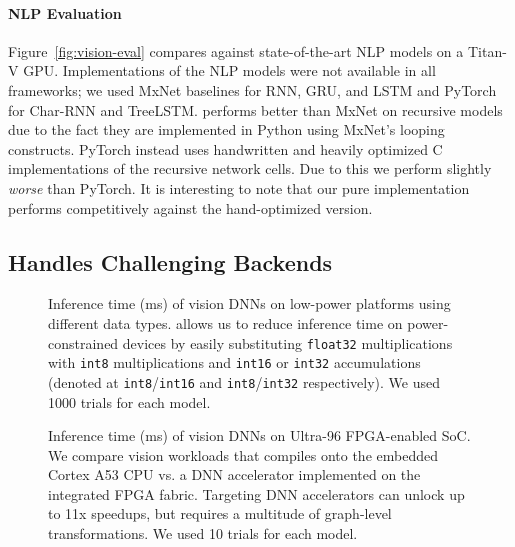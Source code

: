   \paragraph{NLP Evaluation}
  Figure~\ref{fig:vision-eval} compares \relay against state-of-the-art NLP models on a Titan-V GPU.
  Implementations of the NLP models were not available in all frameworks;
    we used MxNet baselines for RNN, GRU, and LSTM and PyTorch for Char-RNN and TreeLSTM.
  \relay performs better than MxNet on recursive models
    due to the fact they are implemented in Python using
    MxNet's looping constructs.
  PyTorch instead uses handwritten and heavily optimized
    C implementations of the recursive network cells.
  Due to this we perform slightly \emph{worse} than PyTorch.
  It is interesting to note that our pure \relay
    implementation performs competitively against
    the hand-optimized version.

  \subsection{\relay Handles Challenging Backends}
  \label{sec:low-power}

  \begin{figure}[h]
    \caption{
      Inference time (ms) of vision DNNs on low-power platforms using
        different data types.
      \relay allows us to reduce inference time on power-constrained devices by
        easily substituting \texttt{float32} multiplications with \texttt{int8}
        multiplications and \texttt{int16} or \texttt{int32} accumulations (denoted
        at \texttt{int8}/\texttt{int16} and \texttt{int8}/\texttt{int32} respectively).
      We used 1000 trials for each model.
    }
  \end{figure}

  \begin{figure}[h]
    \caption{
      Inference time (ms) of vision DNNs on Ultra-96 FPGA-enabled SoC.
      We compare vision workloads that \relay compiles onto the embedded Cortex
        A53 CPU vs. a DNN accelerator implemented on the integrated FPGA fabric.
      Targeting DNN accelerators can unlock up to 11x speedups, but requires a
        multitude of graph-level transformations.
      We used 10 trials for each model.
    }
  \end{figure}

